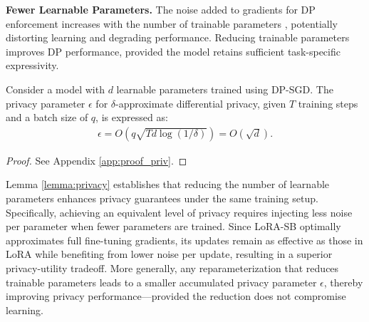 \textbf{Fewer Learnable Parameters.}
The noise added to gradients for DP enforcement increases with the number of trainable parameters \citep{bassily2014private, dgsgd, bun2014fingerprinting}, potentially distorting learning and degrading performance.  
Reducing trainable parameters improves DP performance, provided the model retains sufficient task-specific expressivity.  

\begin{tcolorbox}[colback=cyan!10,colframe=black]
\begin{lemma} \label{lemma:privacy}
    Consider a model with \( d \) learnable parameters trained using DP-SGD. The privacy parameter \( \epsilon \) for \( \delta \)-approximate differential privacy, given \( T \) training steps and a batch size of \( q \), is expressed as:
\begin{align}
    \epsilon = O(q \sqrt{T d \log (1 / \delta)}) = O(\sqrt{d}).
\end{align}
\end{lemma}
\begin{proof}
    See Appendix \ref{app:proof_priv}.
\end{proof}
\end{tcolorbox}

Lemma \ref{lemma:privacy} establishes that reducing the number of learnable parameters enhances privacy guarantees under the same training setup. Specifically, achieving an equivalent level of privacy requires injecting less noise per parameter when fewer parameters are trained.  
Since LoRA-SB optimally approximates full fine-tuning gradients, its updates remain as effective as those in LoRA while benefiting from lower noise per update, resulting in a superior privacy-utility tradeoff.  
More generally, any reparameterization that reduces trainable parameters leads to a smaller accumulated privacy parameter \( \epsilon \), thereby improving privacy performance—provided the reduction does not compromise learning.
\\



